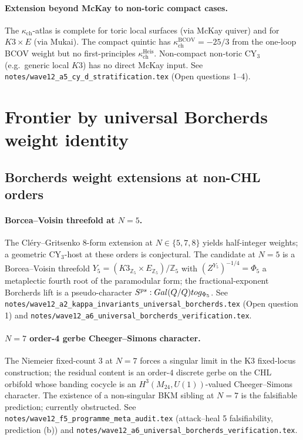\documentclass[11pt]{article}
\providecommand{\Q}{\mathbb{Q}}
\providecommand{\Z}{\mathbb{Z}}
\providecommand{\kch}{\kappa_{\mathrm{ch}}}
\providecommand{\fg}{\mathfrak{g}}
\providecommand{\Mtf}{M_{24}}
\begin{document}
\paragraph{Extension beyond McKay to non-toric compact cases.} The
$\kch$-atlas is complete for toric local surfaces (via McKay
quiver) and for $K3 \times E$ (via Mukai). The compact quintic has
$\kch^{\mathrm{BCOV}} = -25/3$ from the one-loop BCOV weight but no
first-principles $\kch^{\mathrm{Heis}}$. Non-compact non-toric
CY$_3$ (e.g.~generic local $K3$) has no direct McKay input. See
\texttt{notes/wave12\_a5\_cy\_d\_stratification.tex} (Open
questions 1--4).

\section{Frontier by universal Borcherds weight identity}

\subsection{Borcherds weight extensions at non-CHL orders}

\paragraph{Borcea--Voisin threefold at $N = 5$.} The Cl\'ery--Gritsenko
8-form extension at $N \in \{5, 7, 8\}$ yields half-integer weights;
a geometric CY$_3$-host at these orders is conjectural. The
candidate at $N = 5$ is a Borcea--Voisin threefold
$Y_5 = (K3_{\Z_5} \times E_{\Z_5})/\Z_5$ with
$(Z^{Y_5})^{-1/4} = \Phi_5$ a metaplectic fourth root of the
paramodular form; the fractional-exponent Borcherds lift is a
pseudo-character $S^{\mathrm{ps}}: \mathrm{Gal}(\bar\Q/\Q) \to
\fg_{\Phi_5}$. See
\texttt{notes/wave12\_a2\_kappa\_invariants\_universal\_borcherds.tex}
(Open question 1) and
\texttt{notes/wave12\_a6\_universal\_borcherds\_verification.tex}.

\paragraph{$N = 7$ order-4 gerbe Cheeger--Simons character.} The
Niemeier fixed-count $3$ at $N = 7$ forces a singular limit in the
K3 fixed-locus construction; the residual content is an order-$4$
discrete gerbe on the CHL orbifold whose banding cocycle is an
$H^3(\Mtf, U(1))$-valued Cheeger--Simons character. The existence of
a non-singular BKM sibling at $N = 7$ is the falsifiable prediction;
currently obstructed. See
\texttt{notes/wave12\_f5\_programme\_meta\_audit.tex} (attack--heal 5
falsifiability, prediction (b)) and
\texttt{notes/wave12\_a6\_universal\_borcherds\_verification.tex}.
\end{document}
